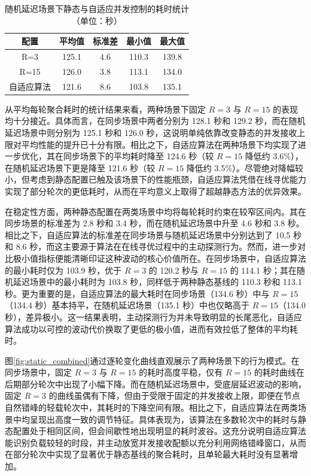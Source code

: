 \documentclass[master, vlined]{DissertUESTC}
\begin{document}
	\begin{table}[!htb]
		\centering
		\caption{随机延迟场景下静态与自适应并发控制的耗时统计（单位：秒）}
		\label{tab:static_random}
		\begin{tabular}{|c|c|c|c|c|}
			\hline
			\textbf{配置} & \textbf{平均值} & \textbf{标准差} & \textbf{最小值} & \textbf{最大值} \\
			\hline
			R=3 & 125.1 & 4.6 & 110.3 & 139.8 \\
			R=15 & 126.0 & 3.8 & 113.1 & 134.0 \\
			自适应算法 & 121.6 & 8.6 & 103.8 & 135.1 \\
			\hline
		\end{tabular}
	\end{table}

	从平均每轮聚合耗时的统计结果来看，两种场景下固定 $R=3$ 与 $R=15$ 的表现均十分接近。具体而言，在同步场景中两者分别为 128.1 秒和 129.2 秒，而在随机延迟场景中则分别为 125.1 秒和 126.0 秒，这说明单纯依靠改变静态的并发接收上限对平均性能的提升已十分有限。相比之下，自适应算法在两种场景下均实现了进一步优化，其在同步场景下的平均耗时降至 124.6 秒（较 $R=15$ 降低约 3.6\%），在随机延迟场景下更是降至 121.6 秒（较 $R=15$ 降低约 3.5\%）。尽管绝对降幅较小，但考虑到静态配置已触及该场景下的性能瓶颈，自适应算法凭借在线寻优能力实现了部分轮次的更低耗时，从而在平均意义上取得了超越静态方法的优异效果。

	在稳定性方面，两种静态配置在两类场景中均将每轮耗时约束在较窄区间内。其在同步场景的标准差为 2.8 秒和 3.4 秒，而在随机延迟场景中升至 4.6 秒和 3.8 秒。相比之下，自适应算法的标准差在同步场景与随机延迟场景中分别达到了 10.5 秒和 8.6 秒，而这主要源于算法在在线寻优过程中的主动探测行为。然而，进一步对比极小值指标便能清晰印证这种波动的核心价值所在。在同步场景中，自适应算法的最小耗时仅为 103.9 秒，优于 $R=3$ 的 120.2 秒与 $R=15$ 的 114.1 秒；其在随机延迟场景中的最小耗时为 103.8 秒，同样低于两种静态基线的 110.3 秒和 113.1 秒。更为重要的是，自适应算法的最大耗时在同步场景（134.6 秒）中与 $R=15$（134.4 秒）基本持平，在随机延迟场景（135.1 秒）中也仅略高于 $R=15$（134.0 秒），差异极小。这一结果表明，主动探测行为并未导致明显的长尾恶化，自适应算法成功以可控的波动代价换取了更低的极小值，进而有效拉低了整体的平均耗时。

	图\ref{fig:static_combined}通过逐轮变化曲线直观展示了两种场景下的行为模式。在同步场景中，固定 $R=3$ 与 $R=15$ 的耗时高度平稳，仅有 $R=15$ 的耗时曲线在后期部分轮次中出现了小幅下降。而在随机延迟场景中，受底层延迟波动的影响，固定 $R=3$ 的曲线虽偶有下降，但由于受限于固定的并发接收上限，即便在节点自然错峰的轻载轮次中，其耗时的下降空间有限。相比之下，自适应算法在两类场景中均呈现出高度一致的调节特征。具体表现为，该算法在多数轮次中的耗时与静态配置处于相同区间，但会间歇性地出现明显的耗时波谷。这充分说明自适应算法能识别负载较轻的时段，并主动放宽并发接收配额以充分利用网络错峰窗口，从而在部分轮次中实现了显著优于静态基线的聚合耗时，且单轮最大耗时没有显著增加。
\end{document}
